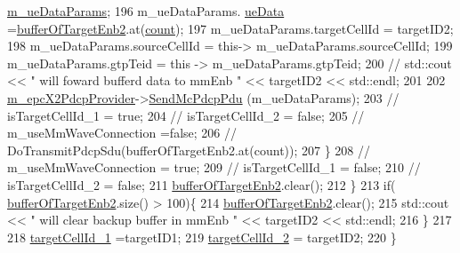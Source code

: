 \begin{DoxyCode}
      \hyperlink{classns3_1_1McEnbPdcp_a287dd059b2cafce7d6c4d4813ee79808}{m\_ueDataParams};
196                                                                 m\_ueDataParams.
      \hyperlink{structns3_1_1EpcX2Sap_1_1UeDataParams_aa194f663de494c1bf03bd42e51b81a8e}{ueData} =\hyperlink{classns3_1_1McEnbPdcp_a36253cb41b4763b611e052d3c261c78c}{bufferOfTargetEnb2}.at(\hyperlink{classns3_1_1McEnbPdcp_abd1cb5ff8d1a5c8b5e3d241d1fbd5240}{count});
197                                                                 m\_ueDataParams.targetCellId = targetID2;
198                                                                 m\_ueDataParams.sourceCellId = this->
      m\_ueDataParams.sourceCellId;
199                                                                 m\_ueDataParams.gtpTeid = \textcolor{keyword}{this} -> 
      m\_ueDataParams.gtpTeid;
200                                                         \textcolor{comment}{//      std::cout << " will foward bufferd data to
       mmEnb " << targetID2 << std::endl;}
201 
202                                                                 
      \hyperlink{classns3_1_1McEnbPdcp_aff328b08ea32259fd2859927a89d280f}{m\_epcX2PdcpProvider}->\hyperlink{classns3_1_1EpcX2PdcpProvider_a3e7d70dc42d16cc0f76758439a9c5b57}{SendMcPdcpPdu} (m\_ueDataParams);
203                         \textcolor{comment}{//      isTargetCellId\_1 = true;}
204                         \textcolor{comment}{//      isTargetCellId\_2 = false;}
205                         \textcolor{comment}{//      m\_useMmWaveConnection =false;}
206                         \textcolor{comment}{//      DoTransmitPdcpSdu(bufferOfTargetEnb2.at(count));}
207                                                         \}
208                 \textcolor{comment}{//              m\_useMmWaveConnection = true;}
209                 \textcolor{comment}{//              isTargetCellId\_1 = false;}
210                 \textcolor{comment}{//              isTargetCellId\_2 = false;}
211                                 \hyperlink{classns3_1_1McEnbPdcp_a36253cb41b4763b611e052d3c261c78c}{bufferOfTargetEnb2}.clear();
212                 \}
213          \textcolor{keywordflow}{if}( \hyperlink{classns3_1_1McEnbPdcp_a36253cb41b4763b611e052d3c261c78c}{bufferOfTargetEnb2}.size() > 100)\{
214                         \hyperlink{classns3_1_1McEnbPdcp_a36253cb41b4763b611e052d3c261c78c}{bufferOfTargetEnb2}.clear();
215                         std::cout << \textcolor{stringliteral}{" will clear backup buffer in mmEnb "} << targetID2 << std::endl;
216                         \}
217 
218         \hyperlink{classns3_1_1McEnbPdcp_a543097504b40179c297529d19a07165d}{targetCellId\_1}  =targetID1;
219         \hyperlink{classns3_1_1McEnbPdcp_a6dc7c7ba7f3f52242b52efd2aac0ac72}{targetCellId\_2} = targetID2;
220 \}
\end{DoxyCode}


